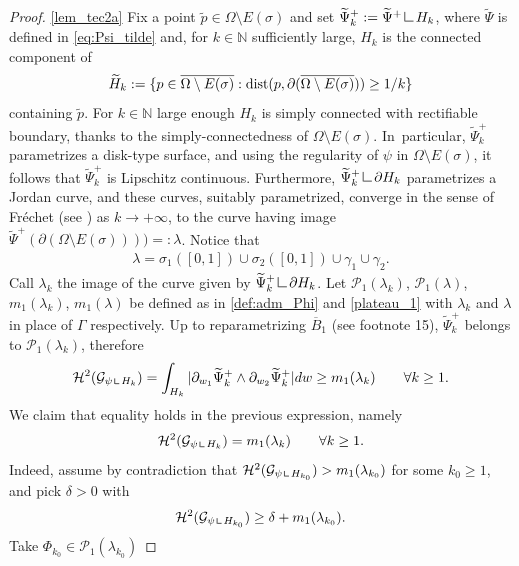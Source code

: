 \documentclass[JEP,XML,SOM,Unicode, NoFloatCountersInSection,published]{cedram}
\let\Om\Omega
\newcommand{\resa}{\mathop{\hbox{\vrule height 7pt width 0.5pt depth 0pt
\vrule height 0.5pt width 6pt depth 0pt}}\nolimits}
\newcommand{\resb}{\mathop{\hbox{\vrule height 4pt width 0.5pt depth 0pt
\vrule height 0.5pt width 3pt depth 0pt}}\nolimits}
\newcommand{\res}{\mathchoice{\resa}{\resa}{\resb}{\resb}}
\theoremstyle{definition}
\begin{document}
\skpt
\begin{proof}
\ref{lem_tec2a}
Fix a point $\widetilde p\in \Om\setminus E(\sigma)$ and set $\widetilde \Psi^+_k:=\widetilde\Psi^+\res H_k$,
where $\widetilde \Psi$ is defined in \eqref{eq:Psi_tilde}
and, for $k\in \mathbb N$ sufficiently large, $H_k$ is the
connected component of
\[
\widetilde H_k:=\{p\in \overline{\Om\setminus E(\sigma)}:\textup{dist}(p,\partial(\overline{\Om\setminus E(\sigma)}) )\geq 1/k\}
\]
containing $\widetilde p$.
For $k \in \mathbb N$ large enough $H_k$ is
simply connected with rectifiable boundary, thanks to the simply-connectedness of $ \Om\setminus E(\sigma)$.
In~particular, $\widetilde \Psi^+_k$ parametrizes a disk-type surface, and
using the regularity of $ \psi$ in ${\Om\setminus E(\sigma)}$,
it follows that $\widetilde \Psi^+_k$ is Lipschitz continuous.
Furthermore,
$\widetilde \Psi^+_k\res \partial H_k$
parametrizes a Jordan curve,
and these curves, suitably parametrized,
converge in the sense of Fréchet (see \cite[Th.\,4, \S 4.3]{DHS})
as $k\to +\infty$, to the curve having image
$\widetilde \Psi^+(\partial ({\Om\setminus E(\sigma)}) ) )=:\lambda$.
Notice that
\begin{align}\label{lambda}
\lambda=\sigma_1([0,1])\cup\sigma_2([0,1])\cup\gamma_1\cup \gamma_2.
\end{align}
Call $\lambda_k$ the image of the curve given by
$\widetilde \Psi^+_k\res \partial H_k$.
Let $\mathcal{P}_1(\lambda_k)$, $\mathcal{P}_1(\lambda)$, $m_1(\lambda_k)$, $m_1(\lambda)$ be defined as in \eqref{def:adm_Phi} and \eqref{plateau_1} with $\lambda_k$ and $\lambda$ in place of $\Gamma$ respectively.
Up to reparametrizing $\overline B_1$ (see footnote 15),
$\widetilde\Psi^+_k$ belongs to $\mathcal{P}_1(\lambda_k)$, therefore
\[
\mathcal H^2( \mathcal G_{\psi\res H_{k}})=\int_{H_k}|\partial_{w_1}\widetilde \Psi_k^+\wedge \partial_{w_2}\widetilde \Psi_k^+ |dw\geq m_1(\lambda_k)\qquad\forall k\geq1.
\]
We claim that equality holds in the previous expression, namely
\begin{align}\label{claim_speranza}
\mathcal H^2( \mathcal G_{\psi\res H_k})=m_1(\lambda_k)\qquad \forall k\geq1.
\end{align}
Indeed, assume by contradiction that $\mathcal H^2( \mathcal G_{\psi\res H_{k_0}})>m_1(\lambda_{k_0})$ for some $k_0\geq1$,
and pick $\delta>0$ with
\begin{equation}\label{eq:absurd}
\mathcal H^2( \mathcal G_{\psi\res H_{k_0}})\geq \delta+
m_1(\lambda_{k_0}).
\end{equation}
Take $\Phi_{k_0}\in \mathcal{P}_1(\lambda_{k_0})$

\end{proof}
\end{document}
